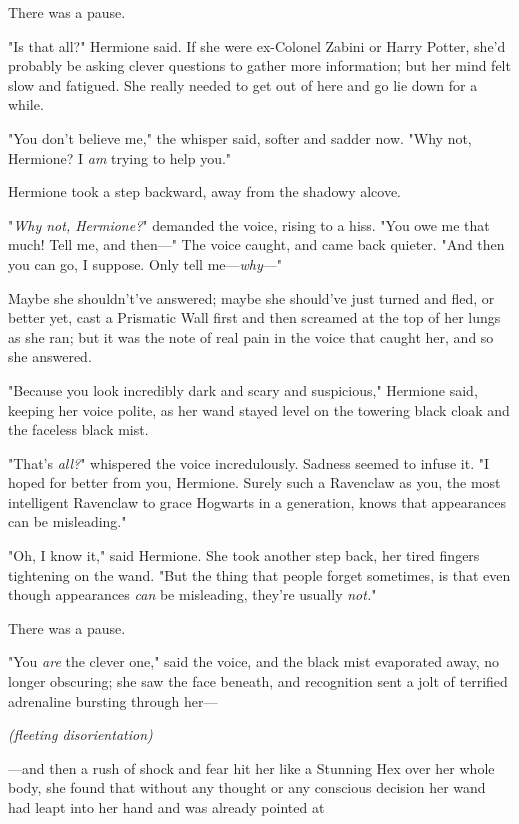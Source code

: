 There was a pause.

"Is that all?" Hermione said. If she were ex-Colonel Zabini or Harry Potter,
she'd probably be asking clever questions to gather more information; but her
mind felt slow and fatigued. She really needed to get out of here and go lie
down for a while.

"You don't believe me," the whisper said, softer and sadder now. "Why not,
Hermione? I \emph{am} trying to help you."

Hermione took a step backward, away from the shadowy alcove.

"\emph{Why not, Hermione?}" demanded the voice, rising to a hiss. "You owe me
that much! Tell me, and then---" The voice caught, and came back quieter. "And
then you can go, I suppose. Only tell me---\emph{why}---"

Maybe she shouldn't've answered; maybe she should've just turned and fled, or
better yet, cast a Prismatic Wall first and then screamed at the top of her
lungs as she ran; but it was the note of real pain in the voice that caught
her, and so she answered.

"Because you look incredibly dark and scary and suspicious," Hermione said,
keeping her voice polite, as her wand stayed level on the towering black cloak
and the faceless black mist.

"That's \emph{all?}" whispered the voice incredulously. Sadness seemed to
infuse it. "I hoped for better from you, Hermione. Surely such a Ravenclaw as
you, the most intelligent Ravenclaw to grace Hogwarts in a generation, knows
that appearances can be misleading."

"Oh, I know it," said Hermione. She took another step back, her tired fingers
tightening on the wand. "But the thing that people forget sometimes, is that
even though appearances \emph{can} be misleading, they're usually \emph{not.}"

There was a pause.

"You \emph{are} the clever one," said the voice, and the black mist evaporated
away, no longer obscuring; she saw the face beneath, and recognition sent a
jolt of terrified adrenaline bursting through her---

\emph{(fleeting disorientation)}

---and then a rush of shock and fear hit her like a Stunning Hex over her whole
body, she found that without any thought or any conscious decision her wand had
leapt into her hand and was already pointed at{\el}

